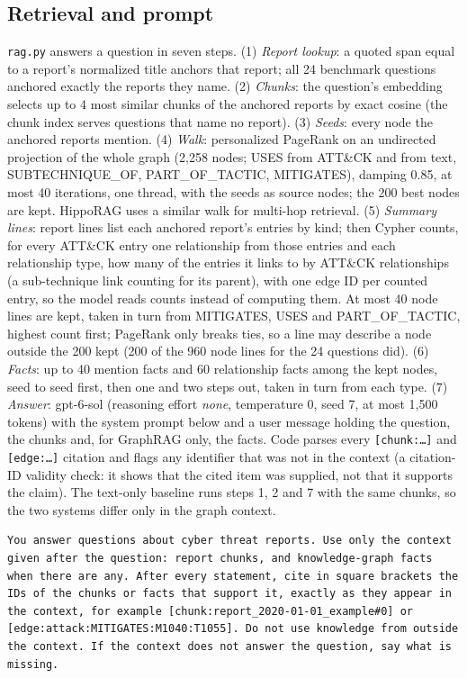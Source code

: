 \documentclass[conference,letterpaper]{IEEEtran}
\newcommand{\code}[1]{\texttt{#1}}
\begin{document}
\subsection{Retrieval and prompt}\label{sec:retrieval}
\code{rag.py} answers a question in seven steps. (1) \emph{Report lookup}: a quoted span equal to a report's normalized title anchors that report; all 24 benchmark questions anchored exactly the reports they name. (2) \emph{Chunks}: the question's embedding selects up to 4 most similar chunks of the anchored reports by exact cosine (the chunk index serves questions that name no report). (3) \emph{Seeds}: every node the anchored reports mention. (4) \emph{Walk}: personalized PageRank \cite{haveliwala2002} on an undirected projection of the whole graph (2,258 nodes; USES from ATT\&CK and from text, SUBTECHNIQUE\_OF, PART\_OF\_TACTIC, MITIGATES), damping 0.85, at most 40 iterations, one thread, with the seeds as source nodes; the 200 best nodes are kept. HippoRAG \cite{gutierrez2024} uses a similar walk for multi-hop retrieval. (5) \emph{Summary lines}: report lines list each anchored report's entries by kind; then Cypher counts, for every ATT\&CK entry one relationship from those entries and each relationship type, how many of the entries it links to by ATT\&CK relationships (a sub-technique link counting for its parent), with one edge ID per counted entry, so the model reads counts instead of computing them. At most 40 node lines are kept, taken in turn from MITIGATES, USES and PART\_OF\_TACTIC, highest count first; PageRank only breaks ties, so a line may describe a node outside the 200 kept (200 of the 960 node lines for the 24 questions did). (6) \emph{Facts}: up to 40 mention facts and 60 relationship facts among the kept nodes, seed to seed first, then one and two steps out, taken in turn from each type. (7) \emph{Answer}: gpt-6-sol (reasoning effort \emph{none}, temperature 0, seed 7, at most 1,500 tokens) with the system prompt below and a user message holding the question, the chunks and, for GraphRAG only, the facts. Code parses every \code{[chunk:\ldots]} and \code{[edge:\ldots]} citation and flags any identifier that was not in the context (a citation-ID validity check: it shows that the cited item was supplied, not that it supports the claim). The text-only baseline runs steps 1, 2 and 7 with the same chunks, so the two systems differ only in the graph context.
\begin{lstlisting}
You answer questions about cyber threat reports. Use only the context given after the question: report chunks, and knowledge-graph facts when there are any. After every statement, cite in square brackets the IDs of the chunks or facts that support it, exactly as they appear in the context, for example [chunk:report_2020-01-01_example#0] or [edge:attack:MITIGATES:M1040:T1055]. Do not use knowledge from outside the context. If the context does not answer the question, say what is missing.
\end{lstlisting}
\end{document}
